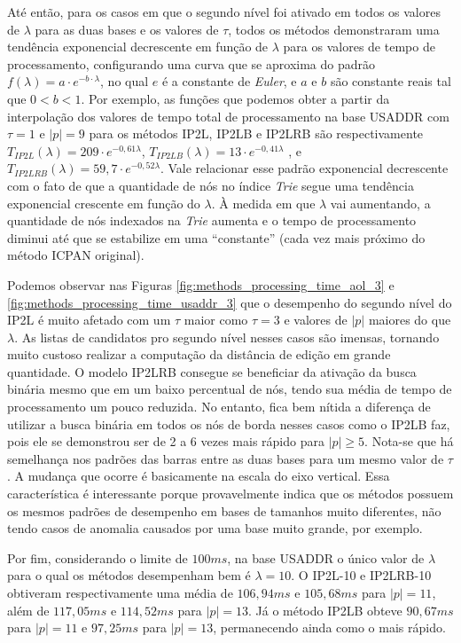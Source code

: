 Até então, para os casos em que o segundo nível foi ativado em todos os valores de $\lambda$ para as duas bases e os valores de $\tau$, todos os métodos demonstraram uma tendência exponencial decrescente em função de $\lambda$ para os valores de tempo de processamento, configurando uma curva que se aproxima do padrão $f(\lambda)=a \cdot e^{-b \cdot \lambda}$, no qual $e$ é a constante de \textit{Euler}, e $a$ e $b$ são constante reais tal que $0 < b < 1 $. Por exemplo, as funções que podemos obter a partir da interpolação dos valores de tempo total de processamento na base USADDR com $\tau=1$ e $|p|=9$ para os métodos IP2L, IP2LB e IP2LRB são respectivamente $T_{IP2L}(\lambda) = 209\cdot e^{-0,61\lambda}$, $T_{IP2LB}(\lambda)=13\cdot e^{-0,41\lambda}$ , e $T_{IP2LRB}(\lambda) = 59,7\cdot e^{-0,52\lambda}$. Vale relacionar esse padrão exponencial decrescente com o fato de que a quantidade de nós no índice \textit{Trie} segue uma tendência exponencial crescente em função do $\lambda$. À medida em que $\lambda$ vai aumentando, a quantidade de nós indexados na \textit{Trie} aumenta e o tempo de processamento diminui até que se estabilize em uma ``constante'' (cada vez mais próximo do método ICPAN original).

Podemos observar nas Figuras \ref{fig:methods_processing_time_aol_3} e \ref{fig:methods_processing_time_usaddr_3} que o desempenho do segundo nível do IP2L é muito afetado com um $\tau$ maior como $\tau=3$ e valores de $|p|$ maiores do que $\lambda$. As listas de candidatos pro segundo nível nesses casos são imensas, tornando muito custoso realizar a computação da distância de edição em grande quantidade. O modelo IP2LRB consegue se beneficiar da ativação da busca binária mesmo que em um baixo percentual de nós, tendo sua média de tempo de processamento um pouco reduzida. No entanto, fica bem nítida a diferença de utilizar a busca binária em todos os nós de borda nesses casos como o IP2LB faz, pois ele se demonstrou ser de 2 a 6 vezes mais rápido para $|p| \geq 5$. Nota-se que há semelhança nos padrões das barras entre as duas bases para um mesmo valor de $\tau$. A mudança que ocorre é basicamente na escala do eixo vertical. Essa característica é interessante porque provavelmente indica que os métodos possuem os mesmos padrões de desempenho em bases de tamanhos muito diferentes, não tendo casos de anomalia causados por uma base muito grande, por exemplo. 


Por fim, considerando o limite de $100ms$, na base USADDR o único valor de $\lambda$ para o qual os métodos desempenham bem é $\lambda=10$. O IP2L-10 e IP2LRB-10 obtiveram respectivamente uma média de $106,94ms$ e $105,68ms$ para $|p|=11$, além de $117,05ms$ e $114,52ms$ para $|p|=13$. Já o método IP2LB obteve $90,67ms$ para $|p|=11$ e $97,25ms$ para $|p|=13$, permanecendo ainda como o mais rápido. 


